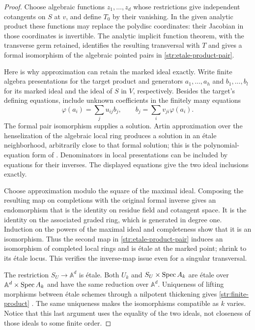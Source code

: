\begin{proof}
Choose algebraic functions $z_1,\ldots,z_d$ whose restrictions give
independent cotangents on $S$ at $v$, and define $T_0$ by their vanishing.
In the given analytic product these functions may replace the polydisc
coordinates: their Jacobian in those coordinates is invertible.  The
analytic implicit function theorem, with the transverse germ retained,
identifies the resulting transversal with $T$ and gives a formal
isomorphism of the algebraic pointed pairs in
\eqref{str:etale-product-pair}.

Here is why approximation can retain the marked ideal exactly.  Write
finite algebra presentations for the target product and generators
$a_1,\ldots,a_h$ and $b_1,\ldots,b_l$ for its marked ideal and the ideal
of $S$ in $V$, respectively.  Besides the target's defining equations,
include unknown coefficients in the finitely many equations
\[
 \varphi(a_i)=\sum_j u_{ij}b_j,
 \qquad b_j=\sum_i v_{ji}\varphi(a_i).
\]
The formal pair isomorphism supplies a solution.  Artin approximation
over the henselization of the algebraic local ring produces a solution
in an \'etale neighborhood, arbitrarily close to that formal solution;
this is the polynomial-equation form of
\cite[Tags 0CAU and 0CAV]{StacksProject}.  Denominators in local
presentations can be included by equations for their inverses.  The
displayed equations give the two ideal inclusions exactly.

Choose approximation modulo the square of the maximal ideal.  Composing
the resulting map on completions with the original formal inverse
gives an endomorphism that is the identity on residue field and
cotangent space.  It is the identity on the associated graded ring,
which is generated in degree one.  Induction on the powers of the
maximal ideal and completeness show that it is an isomorphism.  Thus
the second map in \eqref{str:etale-product-pair} induces an isomorphism
of completed local rings and is \'etale at the marked point; shrink
to its \'etale locus.  This verifies the inverse-map issue even for a
singular transversal.

The restriction $S_U\to\mathbb A^d$ is \'etale.  Both $U_k$ and
$S_U\times\operatorname{Spec} A_k$ are \'etale over
$\mathbb A^d\times\operatorname{Spec} A_k$ and have the same reduction over
$\mathbb A^d$.  Uniqueness of lifting morphisms between \'etale schemes
through a nilpotent thickening gives \eqref{str:finite-product}
\cite[Tag 025H]{StacksProject}.  The same uniqueness makes the
isomorphisms compatible as $k$ varies.  Notice that this last argument
uses the equality of the two ideals, not closeness of those ideals to
some finite order.
\end{proof}

